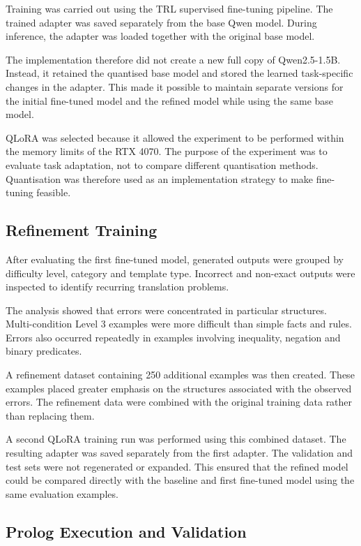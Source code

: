 \documentclass[11pt]{article} %
\theoremstyle{plain}
\theoremstyle{definition}
\begin{document}
Training was carried out using the TRL supervised fine-tuning pipeline.
The trained adapter was saved separately from the base Qwen model. During
inference, the adapter was loaded together with the original base model.

The implementation therefore did not create a new full copy of
Qwen2.5-1.5B. Instead, it retained the quantised base model and stored the
learned task-specific changes in the adapter. This made it possible to maintain
separate versions for the initial fine-tuned model and the refined model while
using the same base model.

QLoRA was selected because it allowed the experiment to be performed within the
memory limits of the RTX 4070. The purpose of the experiment was to evaluate
task adaptation, not to compare different quantisation methods. Quantisation was
therefore used as an implementation strategy to make fine-tuning feasible.

\subsection{Refinement Training}

After evaluating the first fine-tuned model, generated outputs were grouped by
difficulty level, category and template type. Incorrect and non-exact outputs
were inspected to identify recurring translation problems.

The analysis showed that errors were concentrated in particular structures.
Multi-condition Level 3 examples were more difficult than simple facts and
rules. Errors also occurred repeatedly in examples involving inequality,
negation and binary predicates.

A refinement dataset containing 250 additional examples was then created. These
examples placed greater emphasis on the structures associated with the observed
errors. The refinement data were combined with the original training data rather
than replacing them.

A second QLoRA training run was performed using this combined dataset. The
resulting adapter was saved separately from the first adapter. The validation
and test sets were not regenerated or expanded. This ensured that the refined
model could be compared directly with the baseline and first fine-tuned model
using the same evaluation examples.

\subsection{Prolog Execution and Validation}
\end{document}
